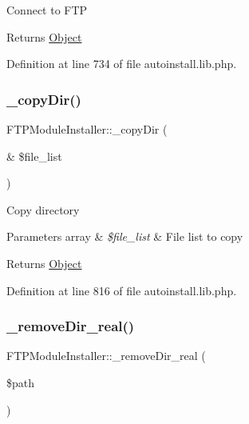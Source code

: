 Connect to F\+TP

\begin{DoxyReturn}{Returns}
\hyperlink{classObject}{Object} 
\end{DoxyReturn}


Definition at line 734 of file autoinstall.\+lib.\+php.

\hypertarget{classFTPModuleInstaller_a48e7b724a4daa35a71163855add13532}{}\label{classFTPModuleInstaller_a48e7b724a4daa35a71163855add13532} 
\subsubsection{\texorpdfstring{\+\_\+copy\+Dir()}{\_copyDir()}}
{\footnotesize\ttfamily F\+T\+P\+Module\+Installer\+::\+\_\+copy\+Dir (\begin{DoxyParamCaption}\item[{\&}]{\$file\+\_\+list }\end{DoxyParamCaption})}

Copy directory


\begin{DoxyParams}[1]{Parameters}
array & {\em \$file\+\_\+list} & File list to copy \\
\hline
\end{DoxyParams}
\begin{DoxyReturn}{Returns}
\hyperlink{classObject}{Object} 
\end{DoxyReturn}


Definition at line 816 of file autoinstall.\+lib.\+php.

\hypertarget{classFTPModuleInstaller_a069e2b098a7b06dfcf65bedf41c0fa0c}{}\label{classFTPModuleInstaller_a069e2b098a7b06dfcf65bedf41c0fa0c} 
\subsubsection{\texorpdfstring{\+\_\+remove\+Dir\+\_\+real()}{\_removeDir\_real()}}
{\footnotesize\ttfamily F\+T\+P\+Module\+Installer\+::\+\_\+remove\+Dir\+\_\+real (\begin{DoxyParamCaption}\item[{}]{\$path }\end{DoxyParamCaption})}

